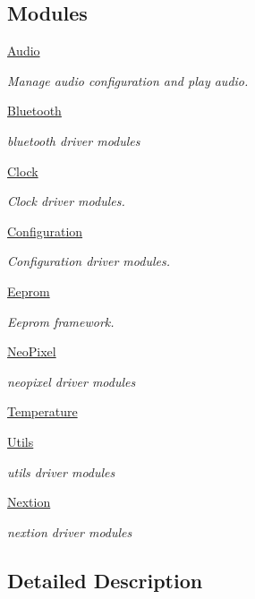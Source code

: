 \subsection*{Modules}
\begin{DoxyCompactItemize}
\item 
\hyperlink{group___audio}{Audio}
\begin{DoxyCompactList}\small\item\em Manage audio configuration and play audio. \end{DoxyCompactList}\item 
\hyperlink{group__bluetooth}{Bluetooth}
\begin{DoxyCompactList}\small\item\em bluetooth driver modules \end{DoxyCompactList}\item 
\hyperlink{group___clock}{Clock}
\begin{DoxyCompactList}\small\item\em Clock driver modules. \end{DoxyCompactList}\item 
\hyperlink{group___configuration}{Configuration}
\begin{DoxyCompactList}\small\item\em Configuration driver modules. \end{DoxyCompactList}\item 
\hyperlink{group___eeprom}{Eeprom}
\begin{DoxyCompactList}\small\item\em Eeprom framework. \end{DoxyCompactList}\item 
\hyperlink{group___neo_pixel}{Neo\+Pixel}
\begin{DoxyCompactList}\small\item\em neopixel driver modules \end{DoxyCompactList}\item 
\hyperlink{group___temperature}{Temperature}
\item 
\hyperlink{group___utils}{Utils}
\begin{DoxyCompactList}\small\item\em utils driver modules \end{DoxyCompactList}\item 
\hyperlink{group__nextion}{Nextion}
\begin{DoxyCompactList}\small\item\em nextion driver modules \end{DoxyCompactList}\end{DoxyCompactItemize}


\subsection{Detailed Description}
